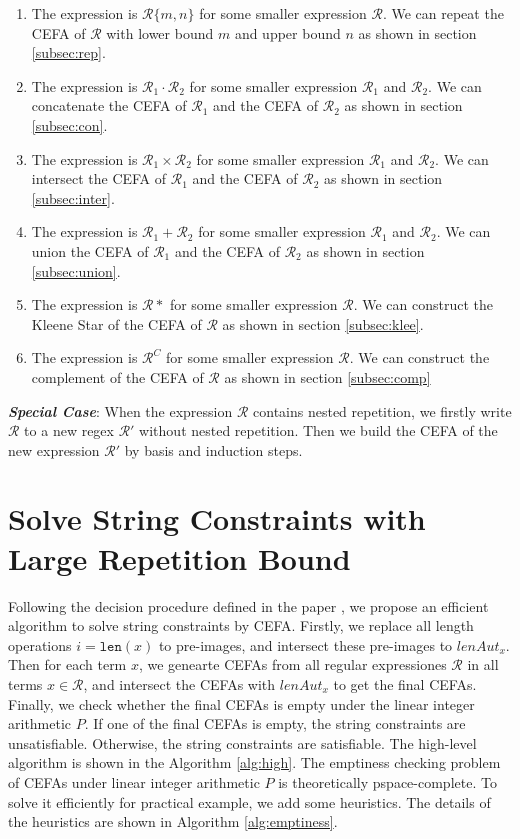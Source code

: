 \documentclass[sigconf]{acmart}
\newcommand*{\regex}{\mathcal{R}}
\newcommand*{\highlight}[1]{\textbf{\textit{#1}}}
\newcommand*{\strlen}[1]{\texttt{len}(#1)}
\begin{document}
\begin{enumerate}
  \item The expression is $\regex\{m,n\}$ for some smaller expression $\regex$. We can repeat the CEFA of $\regex$ with lower bound $m$ and upper bound $n$ as shown in section \ref{subsec:rep}.
  \item The expression is $\regex_1\cdot\regex_2$ for some smaller expression $\regex_1$ and $\regex_2$. We can concatenate the CEFA of $\regex_1$ and the CEFA of $\regex_2$ as shown in section \ref{subsec:con}.
  \item The expression is $\regex_1\times \regex_2$ for some smaller expression $\regex_1$ and $\regex_2$. We can intersect the CEFA of $\regex_1$ and the CEFA of $\regex_2$ as shown in section \ref{subsec:inter}.
  \item The expression is $\regex_1 + \regex_2$ for some smaller expression $\regex_1$ and $\regex_2$. We can union the CEFA of $\regex_1$ and the CEFA of $\regex_2$ as shown in section \ref{subsec:union}.
  \item The expression is $\regex*$ for some smaller expression $\regex$. We can construct the Kleene Star of the CEFA of $\regex$  as shown in section \ref{subsec:klee}.
  \item The expression is $\regex^C$ for some smaller expression $\regex$. We can construct the complement of the CEFA of $\regex$  as shown in section \ref{subsec:comp}
\end{enumerate}
\highlight{Special Case}: When the expression $\regex$ contains nested repetition, we firstly write $\regex$ to a new regex $\regex'$ without nested repetition. Then we build the CEFA of the new expression $\regex'$ by basis and induction steps.

\section{Solve String Constraints with Large Repetition Bound} \label{sec:solve}
Following the decision procedure defined in the paper \cite{atva2020}, we propose an efficient algorithm to solve string constraints by CEFA. Firstly, we replace all length operations $i=\strlen{x}$ to pre-images, and intersect these pre-images to $lenAut_x$. Then for each term $x$, we genearte CEFAs from all regular expressiones $\regex$ in all terms $x\in \regex$, and intersect the CEFAs with $lenAut_x$ to get the final CEFAs. Finally, we check whether the final CEFAs is empty under the linear integer arithmetic $P$. If one of the final CEFAs is empty, the string constraints are unsatisfiable. Otherwise, the string constraints are satisfiable. The high-level algorithm is shown in the Algorithm \ref{alg:high}.\newline
The emptiness checking problem of CEFAs under linear integer arithmetic $P$ is theoretically pspace-complete\cite{atva2020}. To solve it efficiently for practical example, we add some heuristics. The details of the heuristics are shown in Algorithm \ref{alg:emptiness}.
\end{document}
